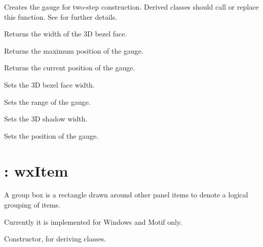 Creates the gauge for two-step construction. Derived classes
should call or replace this function. See \rtfsp
for further details.



Returns the width of the 3D bezel face.



Returns the maximum position of the gauge.

\label{wxgaugegetvalue}


Returns the current position of the gauge.



Sets the 3D bezel face width.

\label{wxgaugesetrange}


Sets the range of the gauge.



Sets the 3D shadow width.

\label{wxgaugesetvalue}


Sets the position of the gauge.

\section{: wxItem}\label{wxgroupbox}

A group box is a rectangle drawn around other panel items to denote
a logical grouping of items.

Currently it is implemented for Windows and Motif only.

\label{groupbox}


Constructor, for deriving classes.

